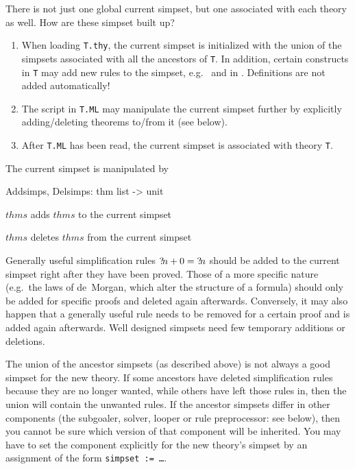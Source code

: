 There is not just one global current simpset, but one associated with each
theory as well. How are these simpset built up?
\begin{enumerate}
\item When loading {\tt T.thy}, the current simpset is initialized with the
  union of the simpsets associated with all the ancestors of {\tt T}. In
  addition, certain constructs in {\tt T} may add new rules to the simpset,
  e.g.\  and  in \HOL. Definitions are not
  added automatically!
\item The script in {\tt T.ML} may manipulate the current simpset further by
  explicitly adding/deleting theorems to/from it (see below).
\item After {\tt T.ML} has been read, the current simpset is associated with
  theory {\tt T}.
\end{enumerate}
The current simpset is manipulated by
\begin{ttbox}
Addsimps, Delsimps: thm list -> unit
\end{ttbox}
\begin{ttdescription}
\item[\ttindexbold{Addsimps} $thms$] adds $thms$ to the current simpset
\item[\ttindexbold{Delsimps} $thms$] deletes $thms$ from the current simpset
\end{ttdescription}

Generally useful simplification rules ${?\!n}+0 = {?\!n}$ should be added
to the current simpset right after they have been proved. Those of a more
specific nature (e.g.\ the laws of de~Morgan, which alter the structure of a
formula) should only be added for specific proofs and deleted again
afterwards. Conversely, it may also happen that a generally useful rule needs
to be removed for a certain proof and is added again afterwards.  Well
designed simpsets need few temporary additions or deletions.

\begin{warn}
  The union of the ancestor simpsets (as described above) is not always a good
  simpset for the new theory.  If some ancestors have deleted simplification
  rules because they are no longer wanted, while others have left those rules
  in, then the union will contain the unwanted rules.  If the ancestor
  simpsets differ in other components (the subgoaler, solver, looper or rule
  preprocessor: see below), then you cannot be sure which version of that
  component will be inherited.  You may have to set the component explicitly
  for the new theory's simpset by an assignment of the form
 {\tt simpset := \dots}.
\end{warn}

